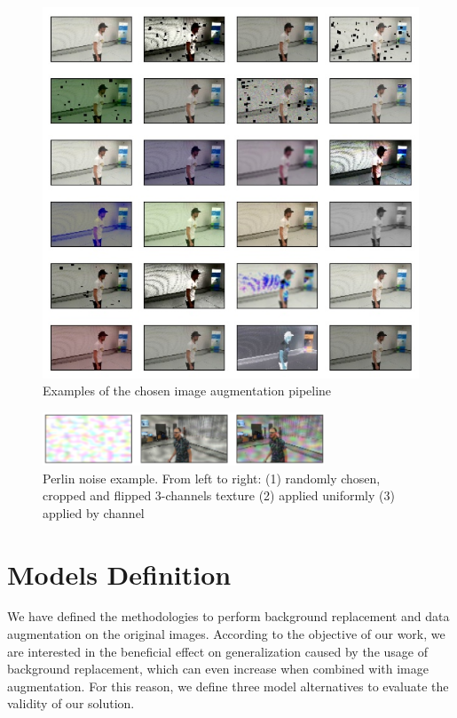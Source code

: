 \begin{figure}[!h]
	\centering
	\includegraphics[width=1 \textwidth]{"contents/images/05-imgaug-chosen"}
	\caption[Examples of the chosen image augmentation pipeline]{Examples of the chosen image augmentation pipeline}
	\label{fig:albumentation-chosen}
\end{figure}

\begin{figure}[!h]
	\centering
	\includegraphics[width=0.75\textwidth]{"contents/images/05-imgaug-pelin"}
	\caption[Perlin noise example]{Perlin noise example. From left to right: (1) randomly chosen, cropped and flipped 3-channels texture (2) applied uniformly (3) applied by channel}
	\label{fig:perlin-noise}
\end{figure}




\section{Models Definition}
\label{sec:model-variants}

We have defined the methodologies to perform background replacement and data augmentation on the original images. According to the objective of our work, we are interested in the beneficial effect on generalization caused by the usage of background replacement, which can even increase when combined with image augmentation. For this reason, we define three model alternatives to evaluate the validity of our solution.

